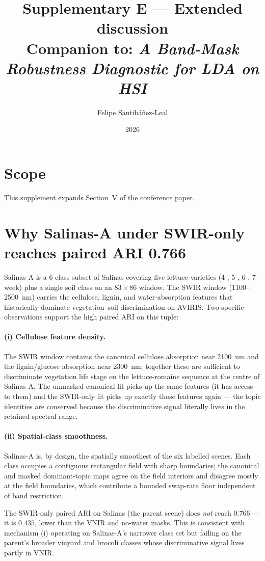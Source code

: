 \documentclass[11pt,a4paper]{article}
\title{Supplementary E --- Extended discussion\\
{\large Companion to: \emph{A Band-Mask Robustness Diagnostic for LDA on HSI}}}
\author{Felipe Santib\'a\~nez-Leal}
\date{2026}
\begin{document}
\maketitle

\section{Scope}
This supplement expands Section~V of the conference paper.

\section{Why Salinas-A under SWIR-only reaches paired ARI 0.766}

Salinas-A is a 6-class subset of Salinas covering five lettuce
varieties (4-, 5-, 6-, 7-week) plus a single soil class on an
$83 \times 86$ window. The SWIR window (1100--2500~nm) carries the
cellulose, lignin, and water-absorption features that historically
dominate vegetation--soil discrimination on AVIRIS. Two specific
observations support the high paired ARI on this tuple:

\paragraph{(i) Cellulose feature density.} The SWIR window contains
the canonical cellulose absorption near 2100~nm and the
lignin/glucose absorption near 2300~nm; together these are
sufficient to discriminate vegetation life stage on the
lettuce-romaine sequence at the centre of Salinas-A. The unmasked
canonical fit picks up the same features (it has access to them) and
the SWIR-only fit picks up exactly those features again --- the
topic identities are conserved because the discriminative signal
literally lives in the retained spectral range.

\paragraph{(ii) Spatial-class smoothness.} Salinas-A is, by design,
the spatially smoothest of the six labelled scenes. Each class
occupies a contiguous rectangular field with sharp boundaries; the
canonical and masked dominant-topic maps agree on the field
interiors and disagree mostly at the field boundaries, which
contribute a bounded swap-rate floor independent of band restriction.

The SWIR-only paired ARI on Salinas (the parent scene) does
\emph{not} reach 0.766 --- it is $0.435$, lower than the VNIR and
no-water masks. This is consistent with mechanism (i) operating on
Salinas-A's narrower class set but failing on the parent's broader
vinyard and brocoli classes whose discriminative signal lives
partly in VNIR.
\end{document}
